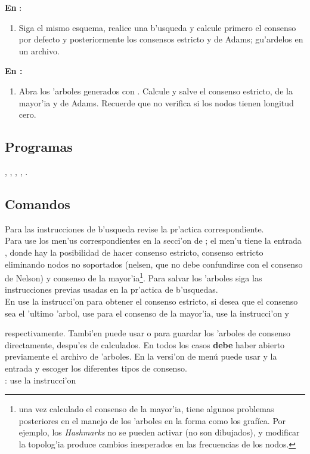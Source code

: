 \textbf{En }:\\
\begin{enumerate}
\item Siga el mismo esquema, realice una b'usqueda y calcule primero el consenso por defecto y posteriormente los consensos estricto y de Adams; gu'ardelos en un archivo.
\end{enumerate}


\textbf{En :}\\
\begin{enumerate}
\item Abra los 'arboles generados con . Calcule y salve el consenso estricto, de la mayor'ia y de Adams. Recuerde que  no verifica si los nodos tienen longitud cero.

\end{enumerate}


\subsection{Programas}
\noindent
{}, , , , .
\subsection{Comandos}
Para las instrucciones de b'usqueda revise la pr'actica correspondiente.\\
Para   use los men'us correspondientes en la secci'on de ; el men'u  tiene la entrada , donde hay la posibilidad de hacer consenso estricto, consenso estricto eliminando nodos no soportados (nelsen, que no debe confundirse con el consenso de Nelson) y consenso de la mayor'ia\footnote{una vez calculado el consenso de la mayor'ia,  tiene algunos problemas posteriores en el manejo de los 'arboles en la forma como los graf\'ica. Por ejemplo, los \textit{Hashmarks} no se pueden activar (no son dibujados), y modificar la topolog'ia produce cambios inesperados en las frecuencias de los nodos.}. Para salvar los 'arboles siga las instrucciones previas usadas en la pr'actica de b'usquedas.\\
En  use la instrucci'on 
para obtener el consenso estricto, si desea que el consenso sea el 'ultimo 'arbol, use 
para el consenso de la mayor'ia, use la instrucci'on 
y 

respectivamente. Tambi'en puede usar   o  para guardar los 'arboles de consenso directamente, despu'es de calculados. En todos los casos \textbf{debe} haber abierto previamente el archivo de 'arboles. En la versi'on de men\'u puede usar  y la entrada  y escoger los diferentes tipos de consenso.\\
: use la instrucci'on 

